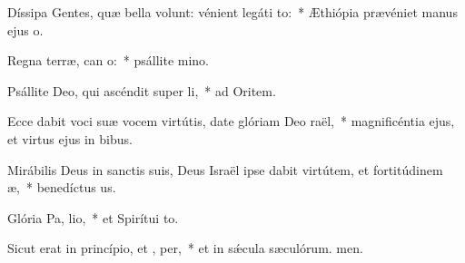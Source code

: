 \item Díssipa Gentes, quæ bella volunt: vénient legáti  to:~* Æthiópia prævéniet manus ejus o.
\item Regna terræ, can o:~* psállite mino.
\item Psállite Deo, qui ascéndit super  li,~* ad Oritem.
\item Ecce dabit voci suæ vocem virtútis, date glóriam Deo  raël,~* magnificéntia ejus, et virtus ejus in bibus.
\item Mirábilis Deus in sanctis suis, Deus Israël ipse dabit virtútem, et fortitúdinem  æ,~* benedíctus us.
\item Glória Pa,  lio,~* et Spirítui to.
\item Sicut erat in princípio, et ,  per,~* et in sǽcula sæculórum. men.
